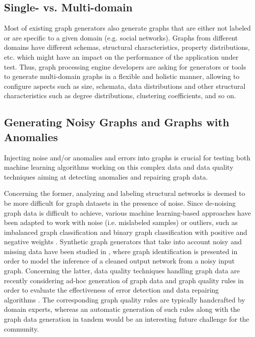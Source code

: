 \subsection{Single- vs. Multi-domain}

Most of existing graph generators also generate graphs that are either not labeled or
are specific to a given domain (e.g.  social networks). Graphs from different
domains have different schemas, structural characteristics, property
distributions, etc. which might have an impact on the performance of the
application under test. Thus, graph processing engine developers are asking for
generators or tools to generate multi-domain graphs  in a flexible and holistic manner, allowing to configure aspects
such as size, schemata, data distributions and other structural
characteristics such as degree distributions, clustering coefficients, and
so on.

\subsection{Generating Noisy Graphs and Graphs with Anomalies}
Injecting noise and/or anomalies and errors into graphs is crucial for
testing both machine learning algorithms working on this complex data and
data quality techniques aiming at detecting anomalies and repairing graph
data.

Concerning the former, analyzing and labeling structural networks is
deemed to be more difficult for graph datasets in the presence of noise.
Since de-noising graph data is difficult to achieve, various machine learning-based 
approaches have been adapted to work with noise (i.e. mislabeled
samples) or outliers, such as
imbalanced graph classification \cite{PanZ13} and
binary graph classification with positive and negative weights \cite{CheungSML16}.
Synthetic graph generators that take into account noisy and missing data
have been studied in \cite{NamataG10}, where graph identification is presented in
order to  model the inference of a cleaned output network from a
noisy input graph.
Concerning the latter, data quality techniques handling graph data are recently considering ad-hoc
generation of graph data and graph quality rules in order to evaluate the
effectiveness of error detection and data repairing algorithms \cite{FanWX16a,AriouaB18}. The
corresponding graph quality rules are typically handcrafted by domain
experts, whereas an automatic generation of such rules along with the graph
data generation in tandem would be an interesting future challenge for the
community.

